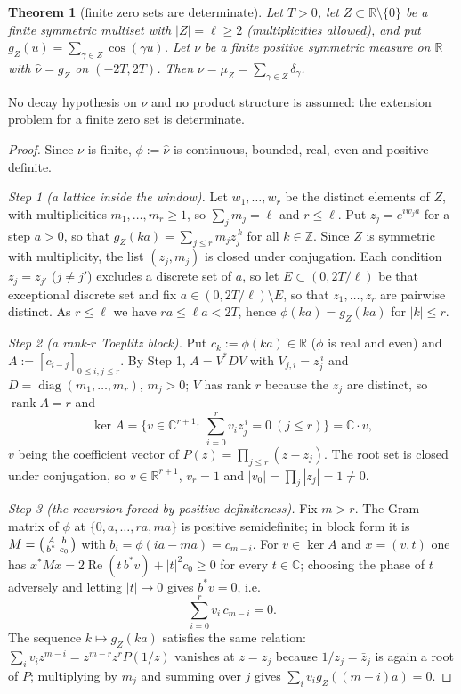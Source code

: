 \documentclass[11pt]{amsart}
\newtheorem{theorem}{Theorem}[section]
\theoremstyle{definition}
\theoremstyle{remark}
\newcommand{\C}{\mathbb C}
\newcommand{\R}{\mathbb R}
\newcommand{\Z}{\mathbb Z}
\newcommand{\Rel}{\operatorname{Re}}
\newcommand{\nuh}{\widehat\nu}
\begin{document}
\begin{theorem}[finite zero sets are determinate]\label{thm:finDet}
Let $T>0$, let $Z\subset\R\setminus\{0\}$ be a finite symmetric multiset with $|Z|=\ell\ge2$
(multiplicities allowed), and put $g_Z(u)=\sum_{\gamma\in Z}\cos(\gamma u)$. Let $\nu$ be a
finite positive symmetric measure on $\R$ with $\nuh=g_Z$ on $(-2T,2T)$. Then
$\nu=\mu_Z=\sum_{\gamma\in Z}\delta_\gamma$.
\end{theorem}
No decay hypothesis on $\nu$ and no product structure is assumed: the extension problem for a
finite zero set is determinate.
\begin{proof}
Since $\nu$ is finite, $\phi:=\nuh$ is continuous, bounded, real, even and positive definite.

\emph{Step 1 (a lattice inside the window).} Let $w_1,\dots,w_r$ be the distinct elements of
$Z$, with multiplicities $m_1,\dots,m_r\ge1$, so $\sum_jm_j=\ell$ and $r\le\ell$. Put $z_j=e^{iw_ja}$ for
a step $a>0$, so that $g_Z(ka)=\sum_{j\le r}m_jz_j^{\,k}$ for all $k\in\Z$. Since $Z$ is symmetric
with multiplicity, the list $(z_j,m_j)$ is closed under conjugation. Each condition $z_j=z_{j'}$
($j\ne j'$) excludes a discrete set of $a$, so let $E\subset(0,2T/\ell)$ be that exceptional discrete
set and fix $a\in(0,2T/\ell)\setminus E$, so that $z_1,\dots,z_r$ are pairwise distinct. As $r\le\ell$ we
have $ra\le\ell a<2T$, hence $\phi(ka)=g_Z(ka)$ for $|k|\le r$.

\emph{Step 2 (a rank-$r$ Toeplitz block).} Put $c_k:=\phi(ka)\in\R$ ($\phi$ is real and even) and
$A:=[c_{i-j}]_{0\le i,j\le r}$. By Step 1, $A=V^*DV$ with $V_{j,i}=z_j^{\,i}$ and
$D=\operatorname{diag}(m_1,\dots,m_r)$, $m_j>0$; $V$ has rank $r$ because the $z_j$ are distinct, so
$\operatorname{rank}A=r$ and
\[
\ker A=\Big\{v\in\C^{r+1}:\ \textstyle\sum_{i=0}^{r}v_iz_j^{\,i}=0\ (j\le r)\Big\}=\C\cdot v,
\]
$v$ being the coefficient vector of $P(z)=\prod_{j\le r}(z-z_j)$. The root set is closed under
conjugation, so $v\in\R^{r+1}$, $v_r=1$ and $|v_0|=\prod_j|z_j|=1\ne0$.

\emph{Step 3 (the recursion forced by positive definiteness).} Fix $m>r$. The Gram matrix of $\phi$
at $\{0,a,\dots,ra,ma\}$ is positive semidefinite; in block form it is
$M=\begin{psmallmatrix}A&b\\b^*&c_0\end{psmallmatrix}$ with $b_i=\phi(ia-ma)=c_{m-i}$. For
$v\in\ker A$ and $x=(v,t)$ one has $x^*Mx=2\Rel(\bar t\,b^*v)+|t|^2c_0\ge0$ for every $t\in\C$;
choosing the phase of $t$ adversely and letting $|t|\to0$ gives $b^*v=0$, i.e.
\begin{equation}\label{eq:frec}
\sum_{i=0}^{r}v_i\,c_{m-i}=0 .
\end{equation}
The sequence $k\mapsto g_Z(ka)$ satisfies the same relation: $\sum_iv_iz^{m-i}=z^{m-r}z^rP(1/z)$
vanishes at $z=z_j$ because $1/z_j=\bar z_j$ is again a root of $P$; multiplying by $m_j$ and
summing over $j$ gives $\sum_iv_ig_Z((m-i)a)=0$.


\end{proof}
\end{document}
